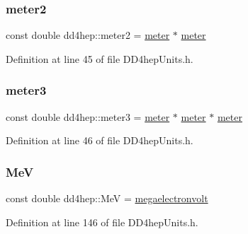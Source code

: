 \subsubsection{\texorpdfstring{meter2}{meter2}}
{\footnotesize\ttfamily const double dd4hep\+::meter2 = \hyperlink{namespacedd4hep_a46f5cf0231796af4296a307a58812b06}{meter} $\ast$ \hyperlink{namespacedd4hep_a46f5cf0231796af4296a307a58812b06}{meter}\hspace{0.3cm}{\ttfamily [static]}}



Definition at line 45 of file D\+D4hep\+Units.\+h.

\hypertarget{namespacedd4hep_a4f771b88b1ff2018c0dacd3a1b56023b}{}\label{namespacedd4hep_a4f771b88b1ff2018c0dacd3a1b56023b} 
\subsubsection{\texorpdfstring{meter3}{meter3}}
{\footnotesize\ttfamily const double dd4hep\+::meter3 = \hyperlink{namespacedd4hep_a46f5cf0231796af4296a307a58812b06}{meter} $\ast$ \hyperlink{namespacedd4hep_a46f5cf0231796af4296a307a58812b06}{meter} $\ast$ \hyperlink{namespacedd4hep_a46f5cf0231796af4296a307a58812b06}{meter}\hspace{0.3cm}{\ttfamily [static]}}



Definition at line 46 of file D\+D4hep\+Units.\+h.

\hypertarget{namespacedd4hep_a6dee62809c6ee54d2fc90671f4dc8b91}{}\label{namespacedd4hep_a6dee62809c6ee54d2fc90671f4dc8b91} 
\subsubsection{\texorpdfstring{MeV}{MeV}}
{\footnotesize\ttfamily const double dd4hep\+::\+MeV = \hyperlink{namespacedd4hep_a4e39beba039f7a6bda24a7031c121b2a}{megaelectronvolt}\hspace{0.3cm}{\ttfamily [static]}}



Definition at line 146 of file D\+D4hep\+Units.\+h.



